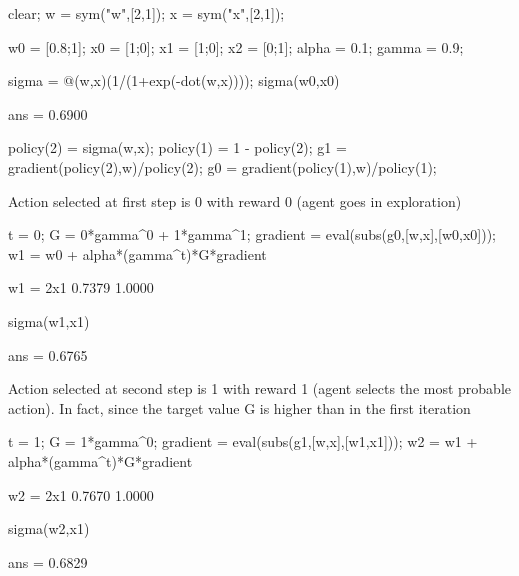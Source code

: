 \documentclass{article}
\begin{document}
\begin{matlabcode}
clear;
w = sym("w",[2,1]);
x = sym("x",[2,1]);

w0 = [0.8;1]; x0 = [1;0]; x1 = [1;0]; x2 = [0;1];
alpha = 0.1; gamma = 0.9;

sigma = @(w,x)(1/(1+exp(-dot(w,x)))); 
sigma(w0,x0) %
\end{matlabcode}
\begin{matlaboutput}
ans = 0.6900
\end{matlaboutput}


\begin{matlabcode}
policy(2) = sigma(w,x);     %
policy(1) = 1 - policy(2);  %
g1 = gradient(policy(2),w)/policy(2); %
g0 = gradient(policy(1),w)/policy(1); %
\end{matlabcode}


\begin{par}
\begin{flushleft}
Action selected at first step is 0 with reward 0 (agent goes in exploration) 
\end{flushleft}
\end{par}

\begin{matlabcode}
t = 0; 
G = 0*gamma^0 + 1*gamma^1;
gradient = eval(subs(g0,[w,x],[w0,x0]));
w1 = w0 + alpha*(gamma^t)*G*gradient
\end{matlabcode}
\begin{matlaboutput}
w1 = 2x1    
    0.7379
    1.0000

\end{matlaboutput}
\begin{matlabcode}
sigma(w1,x1)
\end{matlabcode}
\begin{matlaboutput}
ans = 0.6765
\end{matlaboutput}

\begin{par}
\begin{flushleft}
Action selected at second step is 1 with reward 1 (agent selects the most probable action). In fact, since the target value G is higher than in the first iteration
\end{flushleft}
\end{par}

\begin{matlabcode}
t = 1; 
G = 1*gamma^0;
gradient = eval(subs(g1,[w,x],[w1,x1]));
w2 = w1 + alpha*(gamma^t)*G*gradient
\end{matlabcode}
\begin{matlaboutput}
w2 = 2x1    
    0.7670
    1.0000

\end{matlaboutput}
\begin{matlabcode}
sigma(w2,x1)
\end{matlabcode}
\begin{matlaboutput}
ans = 0.6829
\end{matlaboutput}
\end{document}
